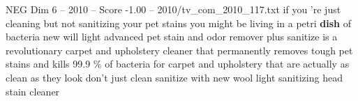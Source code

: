 \begin{textsample}{NEG Dim 6 – 2010 – Score -1.00 – 2010/tv\_com\_2010\_117.txt}  \label{ex:f6_neg_048}
if you 're just cleaning but not sanitizing your pet stains you might be living in a petri \textbf{dish} of bacteria new will light advanced pet stain and odor remover plus sanitize is a revolutionary carpet and upholstery cleaner that permanently removes tough pet stains and kills 99.9 \% of bacteria for carpet and upholstery that are actually as clean as they look don't just clean sanitize with new wool light sanitizing head stain cleaner

\end{textsample}
